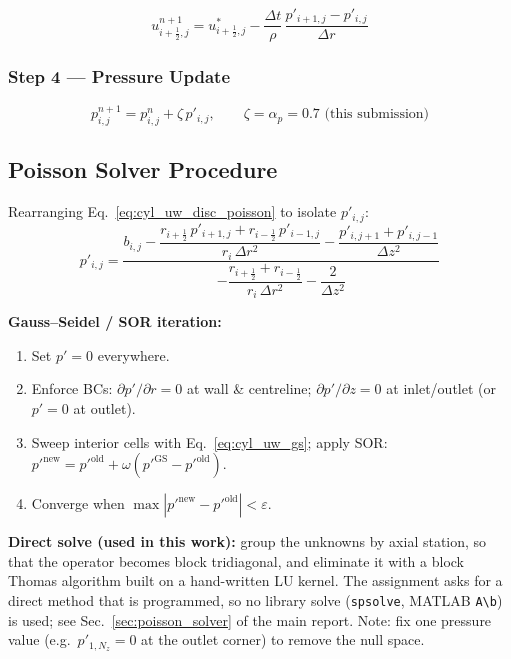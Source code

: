 \begin{equation}
\boxed{
    u^{n+1}_{i+\frac{1}{2},j} = u^*_{i+\frac{1}{2},j}
    - \frac{\Delta t}{\rho}\,\frac{p'_{i+1,j}-p'_{i,j}}{\Delta r}
}
\label{eq:cyl_uw_corr_u}
\end{equation}

\subsubsection{Step 4 --- Pressure Update}

\begin{equation}
\boxed{
    p^{n+1}_{i,j} = p^{n}_{i,j} + \zeta\,p'_{i,j}, \qquad \zeta = \alpha_p = 0.7 \text{ (this submission)}
}
\label{eq:cyl_uw_pupdate}
\end{equation}

\subsection{Poisson Solver Procedure}

Rearranging Eq.~\eqref{eq:cyl_uw_disc_poisson} to isolate $p'_{i,j}$:
\begin{equation}
    p'_{i,j} = \frac{b_{i,j} -
      \dfrac{r_{i+\frac{1}{2}}\,p'_{i+1,j}+r_{i-\frac{1}{2}}\,p'_{i-1,j}}{r_i\,\Delta r^2}
      -\dfrac{p'_{i,j+1}+p'_{i,j-1}}{\Delta z^2}
    }
    {-\dfrac{r_{i+\frac{1}{2}}+r_{i-\frac{1}{2}}}{r_i\,\Delta r^2}
     -\dfrac{2}{\Delta z^2}}
    \label{eq:cyl_uw_gs}
\end{equation}

\textbf{Gauss--Seidel / SOR iteration:}
\begin{enumerate}
    \item Set $p'=0$ everywhere.
    \item Enforce BCs: $\partial p'/\partial r=0$ at wall \& centreline; $\partial p'/\partial z=0$ at inlet/outlet (or $p'=0$ at outlet).
    \item Sweep interior cells with Eq.~\eqref{eq:cyl_uw_gs}; apply SOR: $p'^{\text{new}} = p'^{\text{old}}+\omega(p'^{\text{GS}}-p'^{\text{old}})$.
    \item Converge when $\max|p'^{\text{new}}-p'^{\text{old}}|<\varepsilon$.
\end{enumerate}

\textbf{Direct solve (used in this work):} group the unknowns by axial station, so that the
operator becomes block tridiagonal, and eliminate it with a block Thomas algorithm built on a
hand-written LU kernel. The assignment asks for a direct method that is programmed, so no library
solve (\texttt{spsolve}, MATLAB \texttt{A\textbackslash b}) is used; see Sec.~\ref{sec:poisson_solver}
of the main report.
Note: fix one pressure value (e.g.\ $p'_{1,N_z}=0$ at the outlet corner) to remove the null space.

